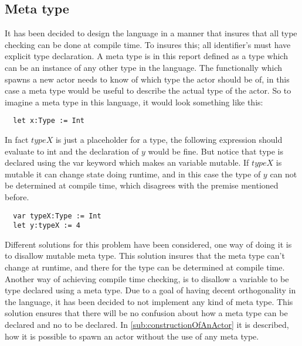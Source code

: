 \subsection{Meta type}
\label{sub:meta_type}

It has been decided to design the language in a manner that insures that all type checking can be done at compile time. To insures this; all identifier's must have explicit type declaration.
A meta type is in this report defined as a type which can be an instance of any other type in the language. %
The functionally which spawns a new actor needs to know of which type the actor should be of, in this case a meta type would be useful to describe the actual type of the actor.
So to imagine a meta type in this language, it would look something like this: %

\begin{verbatim}
  let x:Type := Int
\end{verbatim}

In fact $typeX$ is just a placeholder for a type, the following expression should evaluate to int and the declaration of $y$ would be fine. %
But notice that type is declared using the var keyword which makes an variable mutable. %
If $typeX$ is mutable it can change state doing runtime, and in this case the type of $y$ can not be determined at compile time, which disagrees with the premise mentioned before. %

\begin{verbatim}
  var typeX:Type := Int
  let y:typeX := 4
\end{verbatim}

Different solutions for this problem have been considered, one way of doing it is to disallow mutable meta type. This solution insures that the meta type can't change at runtime, and there for the type can be determined at compile time. Another way of achieving compile time checking, is to disallow a variable to be type declared using a meta type. Due to a goal of having decent orthogonality in the language, it has been decided to not implement any kind of meta type. This solution ensures that there will be no confusion about how a meta type can be declared and no to be declared.
In \cref{sub:constructionOfAnActor} it is described, how it is possible to spawn an actor without the use of any meta type.
